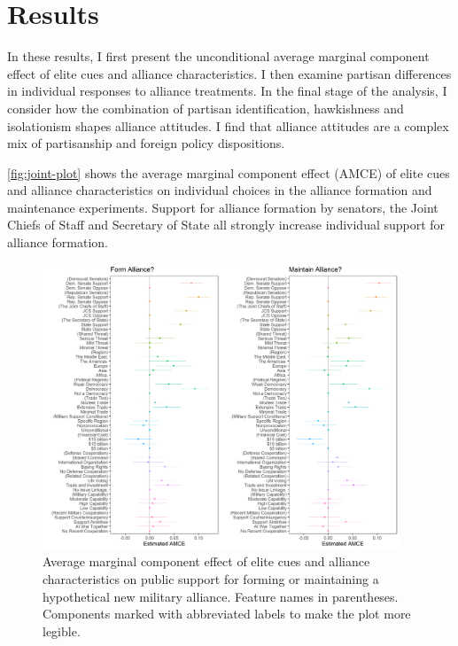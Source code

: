 \documentclass[12pt]{article}
\begin{document}


\section{Results} 


In these results, I first present the unconditional average marginal component effect of elite cues and alliance characteristics.
I then examine partisan differences in individual responses to alliance treatments. 
In the final stage of the analysis, I consider how the combination of partisan identification, hawkishness and isolationism shapes alliance attitudes. 
I find that alliance attitudes are a complex mix of partisanship and foreign policy dispositions. 


\autoref{fig:joint-plot} shows the average marginal component effect (AMCE) of elite cues and alliance characteristics on individual choices in the alliance formation and maintenance experiments.
Support for alliance formation by senators, the Joint Chiefs of Staff and Secretary of State all strongly increase individual support for alliance formation. 


\begin{figure}
	\centering
		\includegraphics[width=0.95\textwidth]{../figures/joint-amce-plots.png}
	\caption{Average marginal component effect of elite cues and alliance characteristics on public support for forming or maintaining a hypothetical new military alliance. Feature names in parentheses. Components marked with abbreviated labels to make the plot more legible.}
	\label{fig:joint-plot}
\end{figure}
\end{document}
